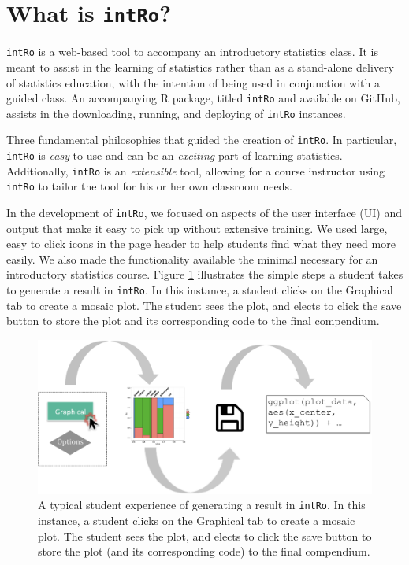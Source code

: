 \documentclass[12pt,]{article}
\begin{document}
\section{\texorpdfstring{What is
\texttt{intRo}?}{What is intRo?}}\label{what-is-intro}

\texttt{intRo} is a web-based tool to accompany an introductory
statistics class. It is meant to assist in the learning of statistics
rather than as a stand-alone delivery of statistics education, with the
intention of being used in conjunction with a guided class. An
accompanying R package, titled \texttt{intRo} and available on GitHub,
assists in the downloading, running, and deploying of \texttt{intRo}
instances.

Three fundamental philosophies that guided the creation of
\texttt{intRo}. In particular, \texttt{intRo} is \emph{easy} to use and
can be an \emph{exciting} part of learning statistics. Additionally,
\texttt{intRo} is an \emph{extensible} tool, allowing for a course
instructor using \texttt{intRo} to tailor the tool for his or her own
classroom needs.

In the development of \texttt{intRo}, we focused on aspects of the user
interface (UI) and output that make it easy to pick up without extensive
training. We used large, easy to click icons in the page header to help
students find what they need more easily. We also made the functionality
available the minimal necessary for an introductory statistics course.
Figure \ref{fig:user_experience} illustrates the simple steps a student
takes to generate a result in \texttt{intRo}. In this instance, a
student clicks on the Graphical tab to create a mosaic plot. The student
sees the plot, and elects to click the save button to store the plot and
its corresponding code to the final compendium.

\begin{figure}[H]
\centering
\includegraphics[width=\linewidth]{user_experience.pdf}
\caption{A typical student experience of generating a result in \texttt{intRo}. In this instance, a student clicks on the Graphical tab to create a mosaic plot. The student sees the plot, and elects to click the save button to store the plot (and its corresponding code) to the final compendium.}
\label{fig:user_experience}
\end{figure}
\end{document}
